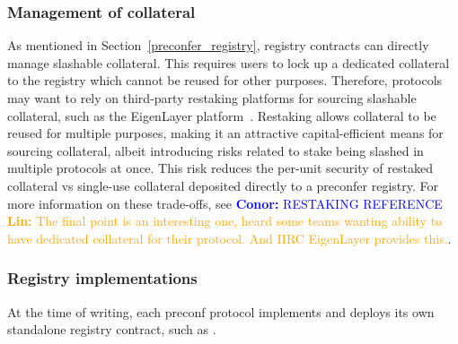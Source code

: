 \documentclass[a4paper]{article}
\theoremstyle{boldstyle}
\newcommand{\cm}[1]{\textcolor{blue}{\textbf{Conor:} #1}}
\newcommand{\lo}[1]{\textcolor{orange}{\textbf{Lin:} #1}}
\newcommand{\dk}[1]{\textcolor{cyan}{\textbf{Demetris:} #1}}
\begin{document}
        \subsubsection{Management of collateral}
        
        As mentioned in Section~\ref{preconfer_registry}, registry contracts can directly manage slashable collateral. This requires users to lock up a dedicated collateral to the registry which cannot be reused for other purposes. Therefore, protocols may want to rely on third-party restaking platforms for sourcing slashable collateral, such as the EigenLayer platform~\cite{W:RestakingOverview}. Restaking allows collateral to be reused for multiple purposes, making it an attractive capital-efficient means for sourcing collateral, albeit introducing risks related to stake being slashed in multiple protocols at once. This risk reduces the per-unit security of restaked collateral vs single-use collateral deposited directly to a preconfer registry. For more information on these trade-offs, see \cm{RESTAKING REFERENCE} \lo{The final point is an interesting one, heard some teams wanting ability to have dedicated collateral for their protocol. And IIRC EigenLayer provides this.}.
    

        \subsubsection{Registry implementations} \label{registry_implementations}
        
        At the time of writing, each preconf protocol implements and deploys its own standalone registry contract, such as \cite{W:Documentation-RegisteringasaProvider}.
\end{document}
